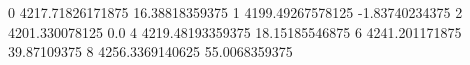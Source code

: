 0 4217.71826171875 16.38818359375
1 4199.49267578125 -1.83740234375
2 4201.330078125 0.0
4 4219.48193359375 18.15185546875
6 4241.201171875 39.87109375
8 4256.3369140625 55.0068359375
